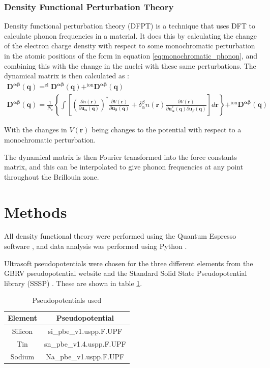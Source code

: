 \documentclass[12pt]{article}
\begin{document}
\subsubsection{Density Functional Perturbation Theory}
Density functional perturbation theory (DFPT) is a technique that uses DFT to calculate phonon frequencies in a material. It does this by calculating the change of the electron charge density with respect to some monochromatic perturbation in the atomic positions of the form in equation \ref{eq:monochromatic_phonon}, and combining this with the change in the nuclei with these same perturbations. The dynamical matrix is then calculated as \cite{baroni2001phonons}:
\begin{equation}\label{eq:DFPT_dynmat}
	\begin{split}
	\mathbf {D^{\alpha\beta}(\mathbf q)} = ^{\mathrm{el}}\mathbf {D^{\alpha\beta}(\mathbf q)}+^{\mathrm{ion}}\mathbf{D^{\alpha\beta}(\mathbf q)}\\
	\mathbf {D^{\alpha\beta}(\mathbf q)} = \frac{1}{N_c}\left\{\int\left[\left(\frac{\partial n(\mathbf r)}{\partial\mathbf{u_\alpha(\mathbf q)}}\right)^*\frac{\partial V(\mathbf r)}{\partial \mathbf {u_\beta(\mathbf q)}}+\delta_\alpha^\beta n(\mathbf r)\frac{\partial V(\mathbf r)}{\partial \mathbf {u_\alpha^*(\mathbf q)}\partial \mathbf u_\beta(\mathbf q)} \right]d\mathbf r \right\} + ^{\mathrm{ion}}\mathbf{D^{\alpha\beta}(\mathbf q)}
\end{split}
\end{equation}

With the changes in $V(\mathbf r)$ being changes to the potential with respect to a monochromatic perturbation.

The dynamical matrix is then Fourier transformed into the force constants matrix, and this can be interpolated to give phonon frequencies at any point throughout the Brillouin zone.

\section{Methods}
All density functional theory were performed using the Quantum Espresso software \cite{0953-8984-21-39-395502}, and data analysis was performed using Python \cite{van2003python}.

Ultrasoft pseudopotentials were chosen for the three different elements from the GBRV pseudopotential website \cite{rutgers} and the Standard Solid State Pseudopotential library (SSSP) \cite{SSSPwebsite}. 
These are shown in table \ref{tab:pseudopotentials}.
\begin{table}
\centering
	\begin{tabular}{|c|c|}
\hline
Element & Pseudopotential \\
\hline
Silicon & si\_pbe\_v1.uspp.F.UPF \cite{rutgers} \\
Tin & sn\_pbe\_v1.4.uspp.F.UPF \cite{rutgers} \\
Sodium & Na\_pbe\_v1.uspp.F.UPF \cite{SSSPwebsite} \\
\hline
\end{tabular}
\caption{Pseudopotentials used}
\label{tab:pseudopotentials}
\end{table}
\end{document}
